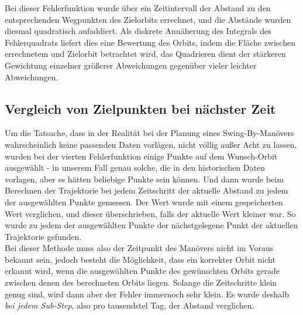 Bei dieser Fehlerfunktion wurde über ein Zeitintervall der Abstand zu den entsprechenden Wegpunkten des Zielorbits errechnet, und die Abstände wurden diesmal quadratisch aufaddiert. Als diskrete Annäherung des Integrals des Fehlerquadrats liefert dies eine Bewertung des Orbits, indem die Fläche zwischen errechnetem und Zielorbit betrachtet wird, das Quadrieren dient der stärkeren Gewichtung einzelner größerer Abweichungen gegenüber vieler leichter Abweichungen.


\subsection{Vergleich von Zielpunkten bei nächster Zeit}

Um die Tatsache, dass in der Realität bei der Planung eines Swing-By-Manövers wahrscheinlich keine passenden Daten vorlägen, nicht völlig außer Acht zu lassen, wurden bei der vierten Fehlerfunktion einige Punkte auf dem Wunsch-Orbit ausgewählt - in unserem Fall genau solche, die in den historischen Daten vorlagen, aber es hätten beliebige Punkte sein können. Und dann wurde beim Berechnen der Trajektorie bei jedem Zeitschritt der aktuelle Abstand zu jedem der ausgewählten Punkte gemessen. Der Wert wurde mit einem gespeicherten Wert verglichen, und dieser überschrieben, falls der aktuelle Wert kleiner war. So wurde zu jedem der ausgewählten Punkte der nächstgelegene Punkt der aktuellen Trajektorie gefunden.\\
Bei dieser Methode muss also der Zeitpunkt des Manövers nicht im Voraus bekannt sein, jedoch besteht die Möglichkeit, dass ein korrekter Orbit nicht erkannt wird, wenn die ausgewählten Punkte des gewünschten Orbits gerade zwischen denen des berechneten Orbits liegen. Solange die Zeitschritte klein genug sind, wird dann aber der Fehler immernoch sehr klein. Es wurde deshalb \textit{bei jedem Sub-Step}, also pro tausendstel Tag, der Abstand verglichen.






